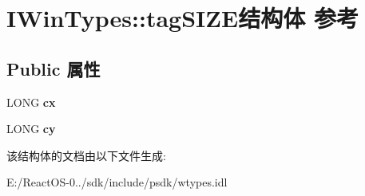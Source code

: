\hypertarget{struct_i_win_types_1_1tag_s_i_z_e}{}\section{I\+Win\+Types\+:\+:tag\+S\+I\+Z\+E结构体 参考}
\label{struct_i_win_types_1_1tag_s_i_z_e}
\subsection*{Public 属性}
\begin{DoxyCompactItemize}
\item 
\mbox{\label{struct_i_win_types_1_1tag_s_i_z_e_abdab8e862d9a556ae7c4786b06f88def}} 
L\+O\+NG {\bfseries cx}
\item 
\mbox{\label{struct_i_win_types_1_1tag_s_i_z_e_a3b921adedd4f9b3deea32231b2507b9d}} 
L\+O\+NG {\bfseries cy}
\end{DoxyCompactItemize}


该结构体的文档由以下文件生成\+:\begin{DoxyCompactItemize}
\item 
E\+:/\+React\+O\+S-\/0../sdk/include/psdk/wtypes.\+idl\end{DoxyCompactItemize}
